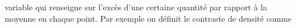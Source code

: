 \message{ !name(intro.tex)}\documentclass[11pt, twoside, a4paper, openright]{report}
\begin{document}
variable qui renseigne sur l'excès d'une certaine quantité par rapport à la moyenne en chaque point. Par exemple on définit le contraste de densité comme

\end{document}
